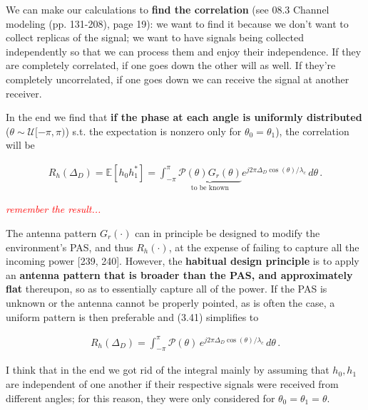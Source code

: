 \documentclass[a4paper, 12pt]{book}
\begin{document}

We can make our calculations to \textbf{find the correlation} (see 08.3 Channel modeling (pp. 131-208), page 19): we want to find it because we don't want to collect replicas of the signal; we want to have signals being collected independently so that we can process them and enjoy their independence.
If they are completely correlated, if one goes down the other will as well. If they're completely uncorrelated, if one goes down we can receive the signal at another receiver.

In the end we find that \textbf{if the phase at each angle is uniformly distributed} ($\theta \sim \mathcal{U}[-\pi, \pi)$) s.t. the expectation is nonzero only for $\theta_0 = \theta_1$), the correlation will be

\begin{align}
R_h(\Delta_D) = \mathbb{E}[h_0 h_1^*] = \int_{-\pi}^{\pi} \underbrace{\mathcal{P}(\theta) G_r(\theta)}_{\text{to be known}} e^{j 2\pi \Delta_D \cos(\theta) / \lambda_c} \, d\theta \,. \tag{3.41}
\end{align}
\begin{flushright}
\textcolor{red}{\footnotesize \textit{remember the result...}}
\end{flushright}

The antenna pattern $G_r(\cdot)$ can in principle be designed to modify the environment's PAS, and thus $R_h(\cdot)$, at the expense of failing to capture all the incoming power [239, 240].
However, the \textbf{habitual design principle} is to apply an \textbf{antenna pattern that is broader than the PAS, and approximately flat} thereupon, so as to essentially capture all of the power.
If the PAS is unknown or the antenna cannot be properly pointed, as is often the case, a uniform pattern is then preferable and (3.41) simplifies to

\begin{align}
R_h(\Delta_D) = \int_{-\pi}^{\pi} \mathcal{P}(\theta) \, e^{j 2\pi \Delta_D \cos(\theta) / \lambda_c} \, d\theta \,. \tag{3.42}
\end{align}

\begin{purplebox}
I think that in the end we got rid of the integral mainly by assuming that $h_0, h_1$ are independent of one another if their respective signals were received from different angles; for this reason, they were only considered for $\theta_0 = \theta_1 = \theta$.
\end{purplebox}
\end{document}
